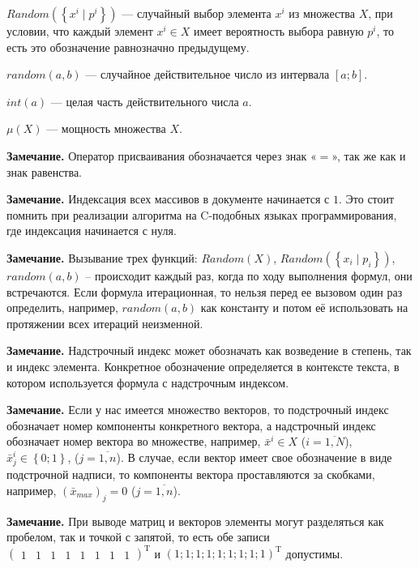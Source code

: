 \documentclass[a4paper,12pt]{article}
\begin{document}
$ Random\left ( \left \{x^i \mid p^i \right \} \right ) $ --- случайный выбор элемента $ x^i $ из множества $ X $, при условии, что каждый элемент $ x^i\in X $ имеет вероятность выбора равную $ p^i $, то есть это обозначение равнозначно предыдущему.

$ random(a,b) $ --- случайное действительное число из интервала $ [a; b] $.

$ int(a) $ --- целая часть действительного числа $ a $.

$ \mu(X) $ --- мощность множества $ X $.

\textbf{Замечание.} Оператор присваивания обозначается через знак «$ = $», так же как и знак равенства.

\textbf{Замечание.} Индексация всех массивов в документе начинается с $ 1 $. Это стоит помнить при реализации алгоритма на C-подобных языках программирования, где индексация начинается с нуля.

\textbf{Замечание.} Вызывание трех функций: $ Random(X) $, $ Random\left ( \left \{x_i \mid p_i \right \} \right ) $, $ random(a,b) $ – происходит каждый раз, когда по ходу выполнения формул, они встречаются. Если формула итерационная, то нельзя перед ее вызовом один раз определить, например, $ random(a,b) $ как константу и потом её использовать на протяжении всех итераций неизменной.

\textbf{Замечание.} Надстрочный индекс может обозначать как возведение в степень, так и индекс элемента. Конкретное обозначение определяется в контексте текста, в котором используется формула с надстрочным индексом. 

\textbf{Замечание.} Если у нас имеется множество векторов, то подстрочный индекс обозначает номер компоненты конкретного вектора, а надстрочный индекс обозначает номер вектора во множестве, например, $ \bar{x}^i \in X $ ($i=\overline{1,N}$), $ \bar{x}^i_j \in \left\lbrace 0; 1\right\rbrace  $, ($j=\overline{1,n}$). В случае, если вектор имеет свое обозначение в виде подстрочной надписи, то компоненты вектора проставляются за скобками, например, $ \left( \bar{x}_{max}\right)_j=0$ ($j=\overline{1,n}$). 

\textbf{Замечание.} При выводе матриц и векторов элементы могут разделяться как пробелом, так и точкой с запятой, то есть обе записи $ {\left(\begin{array}{cccccccc}
 1&1&1&1&1&1&1&1
\end{array} \right)}^\mathrm{T} $ и $ {\left(1;1;1;1;1;1;1;1;1 \right)}^\mathrm{T} $ допустимы.
\end{document}
